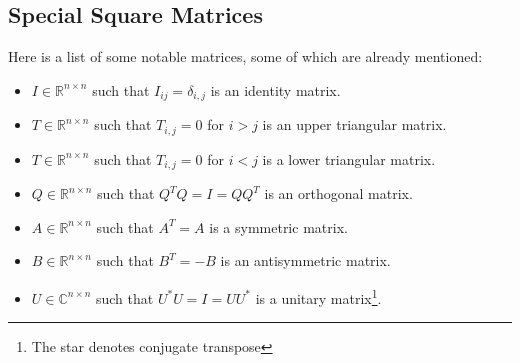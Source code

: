 \documentclass[12pt, a4paper]{article}
\newcommand{\R}{\mathbb{R}}
\theoremstyle{remark}
\theoremstyle{definition}
\numberwithin{equation}{section}
\numberwithin{definition}{section}
\numberwithin{example}{section}
\numberwithin{exercise}{section}
\numberwithin{remark}{section}
\numberwithin{figure}{section}
\begin{document}
\subsection{Special Square Matrices}
Here is a list of some notable matrices, some of which are already mentioned:
\begin{itemize}
    \item $I \in \R^{n \times n}$ such that $I_{ij} = \delta_{i,j}$ is an identity matrix.
    \item $T \in \R^{n \times n}$ such that $T_{i,j} = 0$ for $i > j$ is an upper triangular matrix.
    \item $T \in \R^{n \times n}$ such that $T_{i,j} = 0$ for $i < j$ is a lower triangular matrix.
    \item $Q \in \R^{n \times n}$ such that $Q^T Q = I = Q Q^T$ is an orthogonal matrix.
    \item $A \in \R^{n \times n}$ such that $A^T = A$ is a symmetric matrix.
    \item $B \in \R^{n \times n}$ such that $B^T = -B$ is an antisymmetric matrix.
    \item $U \in \mathbb{C}^{n \times n}$ such that $U^* U = I = U U^*$ is a unitary matrix\footnote{The star denotes conjugate transpose}.
\end{itemize}
\end{document}
